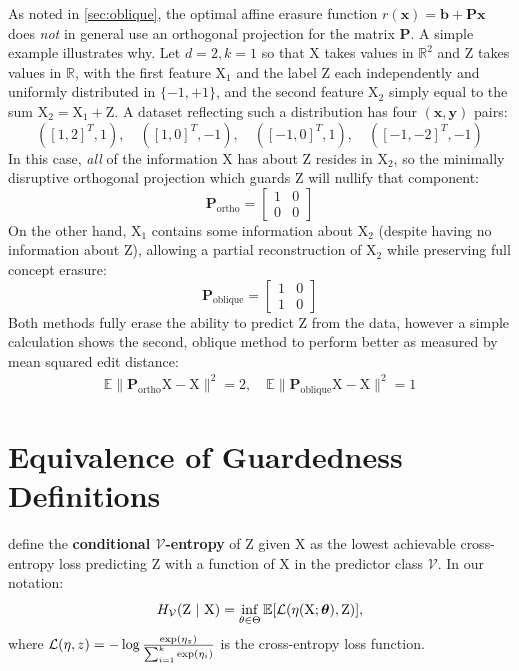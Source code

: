 \documentclass{article}
\theoremstyle{plain}
\theoremstyle{remark}
\newcommand{\vtheta}{{ \boldsymbol \theta}}
\newcommand{\E}{\mathbb E}
\theoremstyle{plain}
\theoremstyle{TheoremNum}
\newcommand{\rv}[1]{{\mathrm{#1}}}
\newcommand{\loss}{\color{black} \mathcal{L}}
\begin{document}
As noted in \autoref{sec:oblique}, the optimal affine erasure function $r(\mathbf{x}) = \mathbf{b} + \mathbf{Px}$ does \textit{not} in general use an orthogonal projection for the matrix $\mathbf{P}$. A simple example illustrates why. Let $d = 2, k = 1$ so that $\rv X$ takes values in $\mathbb R^2$ and $\rv Z$ takes values in $\mathbb R$, with the first feature $\rv X_1$ and the label $\rv Z$ each independently and uniformly distributed in $\{-1, +1\}$, and the second feature $\rv X_2$ simply equal to the sum $\rv X_2 = \rv X_1 + \rv Z$. A dataset reflecting such a distribution has four $(\mathbf x, \mathbf y)$ pairs:
$$([1, 2]^T, 1),\quad([1, 0]^T, -1),\quad([-1, 0]^T, 1),\quad([-1, -2]^T, -1)$$
In this case, \textit{all} of the information $\rv X$ has about $\rv Z$ resides in $\rv X_2$, so the minimally disruptive orthogonal projection which guards $\rv Z$ will nullify that component:
$$\mathbf{P}_\text{ortho} =
\begin{bmatrix}
    1 & 0 \\
    0 & 0
\end{bmatrix}$$
On the other hand, $\rv X_1$ contains some information about $\rv X_2$ (despite having no information about $\rv Z$), allowing a partial reconstruction of $\rv X_2$ while preserving full concept erasure:
$$\mathbf{P}_\text{oblique} =
\begin{bmatrix}
    1 & 0 \\
    1 & 0
\end{bmatrix}$$
Both methods fully erase the ability to predict $\rv Z$ from the data, however a simple calculation shows the second, oblique method to perform better as measured by mean squared edit distance:
\begin{align*}
\E \|\mathbf{P}_\text{ortho}\rv X - \rv X\|^2 = 2,\quad
\E \|\mathbf{P}_\text{oblique}\rv X - \rv X\|^2 = 1
\end{align*}

\section{Equivalence of Guardedness Definitions}\label{guard-eqv-def}

\citet{xu2020theory} define the \textbf{conditional $\mathcal V$-entropy} of $\rv Z$ given $\rv X$ as the lowest achievable cross-entropy loss predicting $\rv Z$ with a function of $\rv X$ in the predictor class $\mathcal V$. In our notation:
\begin{equation*}
    H_{\mathcal V}(\rv Z\ |\ \rv X) = \inf_{\theta \in \Theta} \E[\loss(\eta(\rv X; \vtheta), \rv Z)],
\end{equation*}
where $\loss(\eta, z) = - \log \frac {\exp(\eta_z)} {\sum_{i=1}^k \exp(\eta_i)}$ is the cross-entropy loss function.
\end{document}
